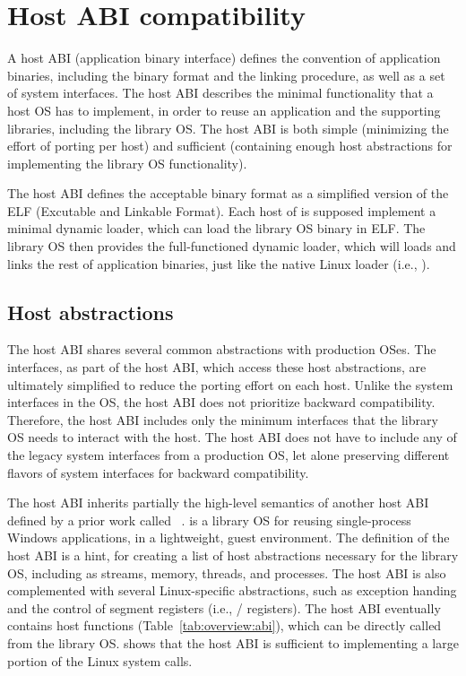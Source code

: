 \section{Host ABI compatibility}
\label{sec:overview:host}

A host ABI (application binary interface) defines the convention of application binaries, including the binary format and the linking procedure, as well as a set of  system interfaces.
The host ABI describes the minimal functionality that a host OS has to implement, in order to reuse an application and the supporting libraries, including the \graphene{} library OS. The host ABI is both simple (minimizing the effort of porting per host) and sufficient (containing enough host abstractions for implementing the library OS functionality).


The host ABI defines the acceptable binary format as a simplified version of the ELF (Excutable and Linkable Format).
Each host of \graphene{} is supposed implement a minimal dynamic loader,
which can load the \graphene{} library OS binary in ELF.
The library OS then provides the full-functioned dynamic loader,
which will loads and links the rest of application binaries, just like the native Linux loader (i.e., ).




\subsection{Host abstractions}
\label{sec:overview:host:abstractions}


The host ABI shares several common abstractions with production OSes. The interfaces, as part of the host ABI, which access these host abstractions, are ultimately simplified to reduce the porting effort on each host.
Unlike the system interfaces in the OS, the host ABI does not prioritize backward compatibility. Therefore, the host ABI includes only the minimum interfaces that the library OS needs to interact with the host. The host ABI does not have to include any of  the legacy system interfaces from a production OS, let alone preserving different flavors of system interfaces for backward compatibility.


The host ABI inherits partially the high-level semantics of another host ABI defined by a prior work called \drawbridge{}~\cite{porter11drawbridge}.
\drawbridge{} is a library OS for reusing single-process Windows applications,
in a lightweight, guest environment.
The definition of the \drawbridge{} host ABI is a hint, for creating a list of host abstractions necessary for the library OS, including as streams, memory, threads, and processes. The host ABI is also complemented with several Linux-specific abstractions, such as exception handing and the control of segment registers (i.e., / registers).
The host ABI eventually contains \palcalls{} host functions (Table~\ref{tab:overview:abi}), which can be directly called from the library OS. \graphene{} shows that the host ABI is sufficient to implementing a large portion of the Linux system calls.


